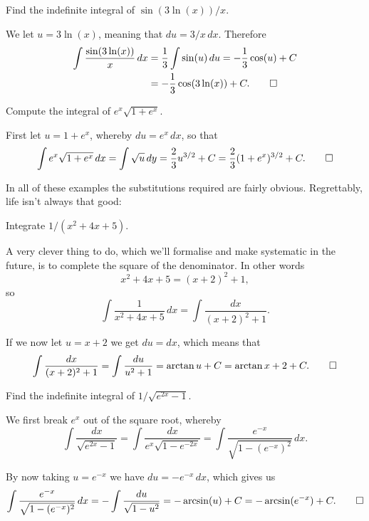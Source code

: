 \begin{example}
	Find the indefinite integral of $\sin(3 \ln(x)) / x$.

	We let $u = 3 \ln(x)$, meaning that $d u = 3 / x \, d x$. Therefore
	\begin{align*}
		\int \frac{\sin(3 \ln(x))}{x} \, d x & = \frac{1}{3} \int \sin(u) \, d u = - \frac{1}{3} \cos(u) + C \\
		                                     & = - \frac{1}{3} \cos(3 \ln(x)) + C. \qedhere
	\end{align*}
\end{example}

\begin{example}
	Compute the integral of $e^x \sqrt{1 + e^x}$.

	First let $u = 1 + e^x$, whereby $d u = e^x \, d x$, so that
	\[
		\int e^x \sqrt{1 + e^x} \, d x = \int \sqrt{u} \, d y = \frac{2}{3} u^{3 / 2} + C = \frac{2}{3} ( 1 + e^x )^{3 / 2} + C. \qedhere
	\]
\end{example}

\noindent
In all of these examples the substitutions required are fairly obvious. Regrettably, life isn't always that good:

\begin{example}
	Integrate $1 / (x^2 + 4 x + 5)$.

	A very clever thing to do, which we'll formalise and make systematic in the future, is to complete the square of the denominator. In other words
	\[
		x^2 + 4 x + 5 = (x + 2)^2 + 1,
	\]
	so
	\[
		\int \frac{1}{x^2 + 4 x + 5} \, d x = \int \frac{d x}{(x + 2)^2 + 1}.
	\]

	\noindent
	If we now let $u = x + 2$ we get $d u = d x$, which means that
	\[
		\int \frac{d x}{(x + 2)^2 + 1} = \int \frac{d u}{u^2 + 1} = \arctan{u} + C = \arctan{x + 2} + C. \qedhere
	\]
\end{example}

\begin{example}
	Find the indefinite integral of $1 / \sqrt{e^{2 x} - 1}$.

	We first break $e^x$ out of the square root, whereby
	\[
		\int \frac{d x}{\sqrt{e^{2 x} - 1}} = \int \frac{d x}{e^x \sqrt{1 - e^{- 2x}}} = \int \frac{e^{-x}}{\sqrt{1 - (e^{- x})^2}} \, d x.
	\]

	\noindent
	By now taking $u = e^{-x}$ we have $d u = - e^{-x} \, d x$, which gives us
	\[
		\int \frac{e^{-x}}{\sqrt{1 - (e^{- x})^2}} \, d x = - \int \frac{d u}{\sqrt{1 - u^2}} = - \arcsin(u) + C = - \arcsin(e^{-x}) + C. \qedhere
	\]
\end{example}

